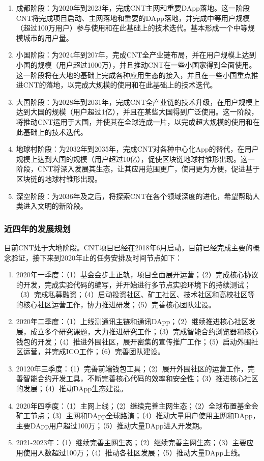 \documentclass[a4paper,12pt]{article}
\begin{document}
\begin{enumerate}
\item 成都阶段：为2020年到2023年，完成CNT主网和重要DApp落地。这一阶段CNT将完成项目启动、主网落地和重要的DApp落地，并完成中等用户规模（超过100万用户）参与使用和在此基础上的技术迭代。基本形成一个中等规模城市的用户量。
\item 小国阶段：为2024年到207年，完成CNT全产业链布局，并在用户规模上达到小国的规模（用户超过1000万），并且推动CNT在一些小国家得到全面使用。这一阶段将在大地的基础上完成各种应用生态的接入，并且在一些小国重点推进CNT的落地，以完成大规模的使用和在此基础上的技术迭代。
\item 大国阶段：为2028年到2031年，完成CNT全产业链的技术升级，在用户规模上达到大国的规模（用户超过1亿），并且在某些大国得到广泛使用。这一阶段，将推动CNT运用于大国，并使其在全球连成一片，以完成超大规模的使用和在此基础上的技术迭代。
\item 地球村阶段：为2032年到2035年，完成CNT对各种中心化App的替代，在用户规模上达到大国的规模（用户超过10亿），促使区块链地球村雏形出现。这一阶段，CNT将深入发展其生态，让其应用范围更广，使用更为方便，促进基于区块链的地球村雏形出现。
\item 深空阶段：为2036年及之后，将探索CNT在各个领域深度的进化，希望帮助人类进入文明的新阶段。
\end{enumerate}

\subsubsection{近四年的发展规划}

目前CNT处于大地阶段。CNT项目已经在2018年6月启动，目前已经完成主要的概念验证，接下来到2020年止的任务安排及时间节点如下：

\begin{enumerate}
\item 2020年一季度：（1）基金会步上正轨，项目全面展开运营；（2）完成核心协议的开发，完成实验代码的编写，并开始进行多节点实验环境下的持续测试；（3）完成私募融资；（4）启动投资社区、矿工社区、技术社区和高校社区等的核心社区运营工作，协力推进研发；（5）完善核心团队建设。
\item 2020年二季度：（1）上线测通讯主链和通讯DApp；（2）继续推进核心社区发展，成立多个研究课题，大力推进研究工作；（3）完成智能合约浏览器和核心钱包的开发；（4）推进外围社区，展开密集的宣传推广工作；（5）启动外围社区运营，并完成ICO工作；（6）完善团队建设。
\item 20120年三季度：（1）完善前端钱包工具；（2）展开外围社区的运营工作，完善智能合约开发工具，不断完善核心代码的效率和安全性；（3）推进核心社区的发展；（4）推动DApp生态建设。
\item 2020年四季度：（1）主网上线；（2）继续完善主网生态；（2）全球布置基金会矿工节点；（3）主网和DApp全球路演；（4）推动大量用户使用主网和DApp，主要DApp用户超过100万；（5）推动大量DApp进入开发期。
\item 2021-2023年：（1）继续完善主网生态；（2）继续完善主网生态；（3）主要应用使用人数超过100万；（4）推动各社区发展；（5）推动大量DApp上线。
\end{enumerate}
\end{document}
